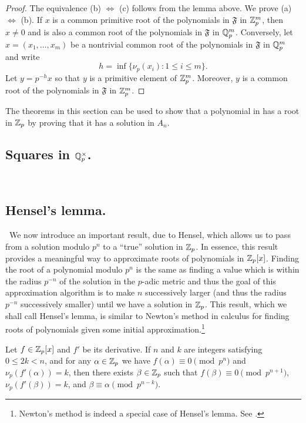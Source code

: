 \begin{proof}
    The equivalence (b) \(\iff\) (c) follows from the lemma above. We prove (a) \(\iff\) (b). If \(x\) is a common primitive root of the polynomials in \(\mathfrak{F}\) in \(\mathbb{Z}_p^m\), then \(x \neq 0\) and is also a common root of the polynomials in \(\mathfrak{F}\) in \(\mathbb{Q}_p^m\). Conversely, let \(x = (x_1, \dots, x_m)\) be a nontrivial common root of the polynomials in \(\mathfrak{F}\) in \(\mathbb{Q}_p^m\) and write
    \[
      h = \inf\{\nu_p(x_i) : 1 \leq i \leq m\}.
    \]
    Let \(y = p^{-h}x\) so that \(y\) is a primitive element of \(\mathbb{Z}_p^m\). Moreover, \(y\) is a common root of the polynomials in \(\mathfrak{F}\) in \(\mathbb{Z}_p^m\).
\end{proof}

The theorems in this section can be used to show that a polynomial in has a root in \(\mathbb{Z}_p\) by proving that it has a solution in \(A_n\). \cite{weismann2006annotations}

\subsection{Squares in \(\mathbb{Q}_p^{\times}\).}~\label{sec:qp-field-props}


\subsection{Hensel's lemma.}~We now introduce an important result, due to Hensel, which allows us to pass from a solution modulo \(p^n\) to a ``true'' solution in \(\mathbb{Z}_p\). In essence, this result provides a meaningful way to approximate roots of polynomials in \(\mathbb{Z}_p[x]\). Finding the root of a polynomial modulo \(p^n\) is the same as finding a value which is within the radius \(p^{-n}\) of the solution in the \(p\)-adic metric \cite{weismann2006annotations} and thus the goal of this approximation algorithm is to make \(n\) successively larger (and thus the radius \(p^{-n}\) successively smaller) until we have a solution in \(\mathbb{Z}_p\). This result, which we shall call Hensel's lemma, is similar to Newton's method in calculus for finding roots of polynomials given some initial approximation.\footnote{Newton's method is indeed a special case of Hensel's lemma. See \cite{von1984hensel}.}

\begin{lemma}
    Let \(f \in \mathbb{Z}_p[x]\) and \(f'\) be its derivative. If \(n\) and \(k\) are integers satisfying \(0 \leq 2k < n\), and for any \(\alpha \in \mathbb{Z}_p\) we have \(f(\alpha) \equiv 0 \pmod{p^n}\) and \(\nu_p(f'(\alpha)) = k\), then there exists \(\beta \in \mathbb{Z}_p\) such that \(f(\beta) \equiv 0 \pmod{p^{n + 1}}\), \(\nu_p(f'(\beta)) = k\), and \(\beta \equiv \alpha \pmod{p^{n-k}}\).
\end{lemma}

